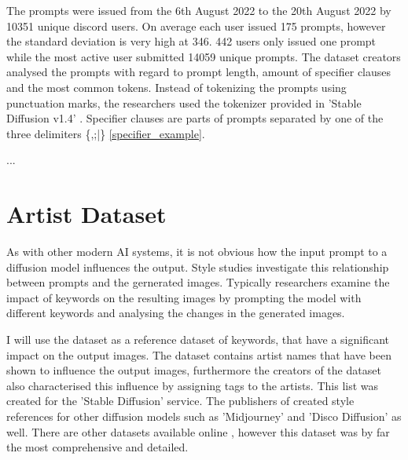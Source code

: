 The prompts were issued from the 6th August 2022 to the 20th August 2022 by 10351 unique discord users. On average each user issued 175 prompts, however the standard deviation is very high at 346. 442 users only issued one prompt while the most active user submitted 14059 unique prompts. 
The dataset creators \autocite{poloclub-diffusiondb} analysed the prompts with regard to prompt length, amount of specifier clauses and the most common tokens. Instead of tokenizing the prompts using punctuation marks, the researchers used the tokenizer provided in 'Stable Diffusion v1.4' \autocite{sd}. Specifier clauses are parts of prompts separated by one of the three delimiters \{,;|\} \ref{specifier_example}. 




...

\section{Artist Dataset}
\label{cha:Artist Dataset}

As with other modern AI systems, it is not obvious how the input prompt to a diffusion model influences the output. Style studies investigate this relationship between prompts and the gernerated images. Typically researchers examine the impact of keywords on the resulting images by prompting the model with different keywords and analysing the changes in the generated images.

I will use the dataset \autocite{thelist} as a reference dataset of keywords, that have a significant impact on the output images. The dataset contains artist names that have been shown to influence the output images, furthermore the creators of the dataset also characterised this influence by assigning tags to the artists. This list was created for the 'Stable Diffusion' service. The publishers of \autocite{thelist} created style references for other diffusion models such as 'Midjourney' and 'Disco Diffusion' as well.
There are other datasets available online \autocite{sd-fr}, however this dataset was by far the most comprehensive and detailed. 


